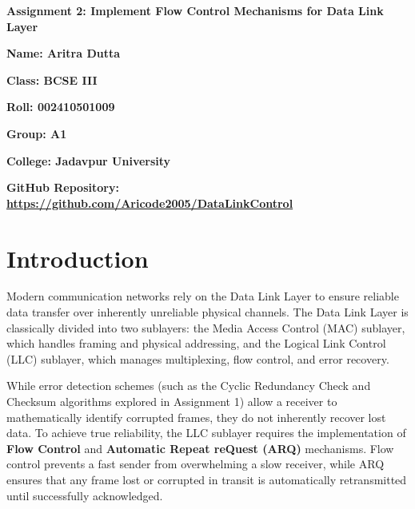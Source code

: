 \documentclass[12pt]{article}
\begin{document}
\begin{titlepage}
    \centering
    \vspace*{2cm}
    
    {\Large\bfseries Assignment 2: Implement Flow Control Mechanisms for Data Link Layer\par}
    \vspace{2cm}
    
    {\Large\bfseries Name: Aritra Dutta\par}
    \vspace{1cm}
    
    {\Large\bfseries Class: BCSE III\par}
    \vspace{1cm}
    
    {\Large\bfseries Roll: 002410501009\par}
    \vspace{1cm}
    
    {\Large\bfseries Group: A1\par}
    \vspace{1cm}
    
    {\Large\bfseries College: Jadavpur University\par}
    \vspace{1.5cm}
    
    {\normalsize\bfseries GitHub Repository: \url{https://github.com/Aricode2005/DataLinkControl}\par}
    
    \vfill
\end{titlepage}

\tableofcontents
\newpage

\section{Introduction}
Modern communication networks rely on the Data Link Layer to ensure reliable data transfer over inherently unreliable physical channels. The Data Link Layer is classically divided into two sublayers: the Media Access Control (MAC) sublayer, which handles framing and physical addressing, and the Logical Link Control (LLC) sublayer, which manages multiplexing, flow control, and error recovery. 

While error detection schemes (such as the Cyclic Redundancy Check and Checksum algorithms explored in Assignment 1) allow a receiver to mathematically identify corrupted frames, they do not inherently recover lost data. To achieve true reliability, the LLC sublayer requires the implementation of \textbf{Flow Control} and \textbf{Automatic Repeat reQuest (ARQ)} mechanisms. Flow control prevents a fast sender from overwhelming a slow receiver, while ARQ ensures that any frame lost or corrupted in transit is automatically retransmitted until successfully acknowledged.
\end{document}
